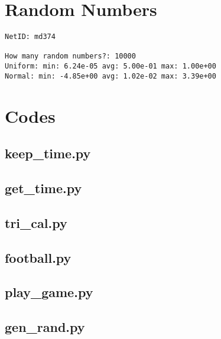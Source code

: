 \documentclass{article}
\begin{document}
\section{Random Numbers}
\begin{lstlisting}
NetID: md374

How many random numbers?: 10000
Uniform: min: 6.24e-05 avg: 5.00e-01 max: 1.00e+00
Normal: min: -4.85e+00 avg: 1.02e-02 max: 3.39e+00
\end{lstlisting}

\pagebreak
\appendix
\section{Codes}
\lstset{style=python103, language=python} 





\subsection{keep\_time.py}


\subsection{get\_time.py}


\subsection{tri\_cal.py}


\subsection{football.py}


\subsection{play\_game.py}


\subsection{gen\_rand.py}

\end{document}
